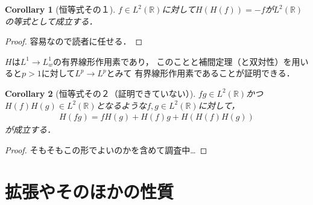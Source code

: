 \documentclass[dvipdfmx,autodetect-engine]{jsarticle}
\newtheorem{corollary}{Corollary}[theorem]
\theoremstyle{remark}
\theoremstyle{definition}
\newcommand{\R}{\mathbb{R}}
\begin{document}
\begin{corollary}[恒等式その１]
    $f \in L^2(\R)$に対して$H(H(f)) = - f$が$L^2(\R)$の等式として成立する．
\end{corollary}

\begin{proof}
    容易なので読者に任せる．
\end{proof}

$H$は$L^1 \to L^1_w$の有界線形作用素であり，
このことと補間定理（と双対性）を用いると$p>1$に対して$L^p \to L^p$とみて
有界線形作用素であることが証明できる．

\begin{corollary}[恒等式その２（証明できていない）]
    $fg \in L^2(\R)$かつ$H(f)H(g) \in L^2(\R)$となるような$f,g \in L^2(\R)$に対して，
    \begin{align}
        H(fg) = fH(g) + H(f)g + H(H(f)H(g))
    \end{align}
    が成立する．
\end{corollary}

\begin{proof}
    そもそもこの形でよいのかを含めて調査中…
\end{proof}


\section{拡張やそのほかの性質}
    
\end{document}
